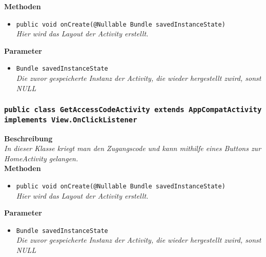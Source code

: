                 \textbf{Methoden}
                \begin{itemize}
        		\item\texttt{{public void onCreate(@Nullable Bundle savedInstanceState)}}\\
                \textit{Hier wird das Layout der Activity erstellt.}\\
                \end{itemize}
                
                \textbf{Parameter}
                \begin{itemize}
        		\item\texttt{Bundle savedInstanceState}\\ 
                \textit{Die zuvor gespeicherte Instanz der Activity, die wieder hergestellt zwird, sonst NULL}\\
                \end{itemize}      
                
        \subsubsection{\texttt{public class GetAccessCodeActivity extends AppCompatActivity implements View.OnClickListener}}
               
               	\textbf{Beschreibung} \\
      	        \textit{In dieser Klasse kriegt man den Zugangscode und kann mithilfe eines Buttons zur HomeActivity gelangen.} \\
                
                \textbf{Methoden}
                \begin{itemize}
        		\item\texttt{{public void onCreate(@Nullable Bundle savedInstanceState)}}\\
                \textit{Hier wird das Layout der Activity erstellt.}\\
                \end{itemize}
                
                \textbf{Parameter}
                \begin{itemize}
        		\item\texttt{Bundle savedInstanceState}\\  
                \textit{Die zuvor gespeicherte Instanz der Activity, die wieder hergestellt zwird, sonst NULL}\\
                \end{itemize}  
                
